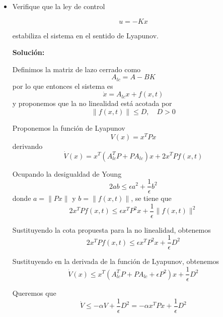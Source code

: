 \begin{itemize}
    \item Verifique que la ley de control
    
    \begin{equation*}
        u = -Kx 
    \end{equation*}

    estabiliza el sistema en el sentido de Lyapunov.

    \textbf{Solución:}

Definimos la matriz de lazo cerrado como
\begin{equation*}
    A_{lc} = A - BK
\end{equation*}
por lo que entonces el sistema es
\begin{equation*}
    \dot{x} = A_{lc}x + f(x,t)
\end{equation*}
y proponemos que la no linealidad está acotada por
\begin{equation*}
    \|f(x,t)\| \leq D, \quad D>0
\end{equation*}

Proponemos la función de Lyapunov
\begin{equation*}
    V(x) = x^TPx
\end{equation*}
derivando
\begin{equation*}
    \dot{V}(x) = x^T(A_{lc}^TP + PA_{lc})x + 2x^TPf(x,t)
\end{equation*}

Ocupando la desigualdad de Young
\begin{equation*}
    2ab \leq \epsilon a^2 + \frac{1}{\epsilon}b^2
\end{equation*}
donde \(a = \|Px\|\) y \(b = \|f(x,t)\|\), se tiene que
\begin{equation*}
    2x^TPf(x,t) \leq \epsilon x^TP^2x + \frac{1}{\epsilon}\|f(x,t)\|^2
\end{equation*}

Sustituyendo la cota propuesta para la no linealidad, obtenemos
\begin{equation*}
    2x^TPf(x,t) \leq \epsilon x^TP^2x + \frac{1}{\epsilon}D^2   
\end{equation*}

Sustituyendo en la derivada de la función de Lyapunov, obtenemos
\begin{equation*}
    \dot{V}(x) \leq x^T(A_{lc}^TP + PA_{lc} + \epsilon P^2)x + \frac{1}{\epsilon}D^2
\end{equation*}

Queremos que
\begin{equation*}
    \dot{V} \leq - \alpha V+\frac{1}{\epsilon}D^2 = -\alpha x^TPx + \frac{1}{\epsilon}D^2
\end{equation*}


\end{itemize}
